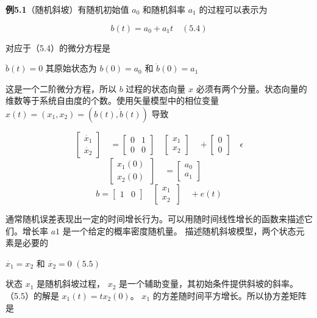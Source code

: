 	\textbf{例5.1}（随机斜坡）有随机初始值 $ a_{0} $ 和随机斜率 $ a_{1} $ 的过程可以表示为
	
	 \begin{equation}\label{5.4}
	b(t)=a_{0}+a_{1}t \quad(5.4)
	\end{equation}
	
	 
	 对应于（5.4）的微分方程是 
	 
	  $\ddot{b}(t)=0  $ 其原始状态为 $ b(0)=a_{0} $  和 $ \dot{b}(0)=a_{1} $
	  
	  这是一个二阶微分方程，所以 $ b $ 过程的状态向量 $ x $ 必须有两个分量。状态向量的维数等于系统自由度的个数。使用矢量模型中的相位变量 $ x(t)=(x_{1},x_{2})=(b(t),\dot{b}(t)) $ 导致
	  
	  \[ \begin{bmatrix} \dot{x_{1}}  \\ \dot{x_{2}} \end{bmatrix} \quad=\begin{bmatrix} 0 & 1 \\ 0 &  0 \end{bmatrix} \quad\begin{bmatrix} x_{1}  \\ x_{2}  \end{bmatrix} \quad+\begin{bmatrix} 0 \\ 0 \end{bmatrix} \quad\epsilon\] 
	 \[ \begin{bmatrix} x_{1}(0)\\ x_{2}(0)\ \end{bmatrix} \quad=\begin{bmatrix} a_{0} \\ a_{1}\end{bmatrix} \quad \]
	 \[ b= \begin{bmatrix} 1 & 0\end{bmatrix} \quad\begin{bmatrix} x_{1}\\ x_{2}\ \end{bmatrix} \quad+e(t)\]
	  
	  通常随机误差表现出一定的时间增长行为。可以用随时间线性增长的函数来描述它们。增长率 $ a1 $ 是一个给定的概率密度随机量。 描述随机斜坡模型，两个状态元素是必要的
	  
	   $ \dot{x_{1}}=x_{2} $ 和 $ \dot{x_{2}}=0 $  $ (5.5) $
	   
	   
	   状态 $ x_{1} $ 是随机斜坡过程， $ x_{2} $ 是一个辅助变量，其初始条件提供斜坡的斜率。（5.5）的解是 $x_{1}(t)=tx_{2}(0) $。 $ x_{1} $ 的方差随时间平方增长。所以协方差矩阵是
	   
